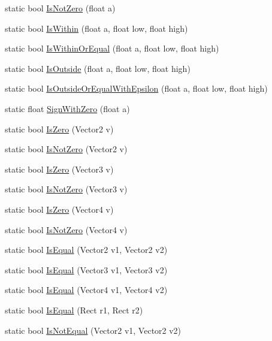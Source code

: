 \begin{DoxyCompactItemize}
\item 
static bool \hyperlink{class_math3_d_a165cde6214cb8dc360e62a1445823306}{Is\+Not\+Zero} (float a)
\item 
static bool \hyperlink{class_math3_d_a0fbec7ff9a0816ccee82b23e6d674981}{Is\+Within} (float a, float low, float high)
\item 
static bool \hyperlink{class_math3_d_a28c345936172776f2201aa51e8e040d3}{Is\+Within\+Or\+Equal} (float a, float low, float high)
\item 
static bool \hyperlink{class_math3_d_a616e6780c57dda6131c61c170e9847f1}{Is\+Outside} (float a, float low, float high)
\item 
static bool \hyperlink{class_math3_d_a451aa8ef4a6651ca172daeb097d3ddd1}{Is\+Outside\+Or\+Equal\+With\+Epsilon} (float a, float low, float high)
\item 
static float \hyperlink{class_math3_d_aacbf0bf5e0634621609a6bb6e0dda252}{Sign\+With\+Zero} (float a)
\item 
static bool \hyperlink{class_math3_d_ac0b99d9c74868285ae5969592d9498cb}{Is\+Zero} (Vector2 v)
\item 
static bool \hyperlink{class_math3_d_a9a008dd90716a6cf013777e15f2b573c}{Is\+Not\+Zero} (Vector2 v)
\item 
static bool \hyperlink{class_math3_d_acc93b045367c6388a1a0e9f4cca53e62}{Is\+Zero} (Vector3 v)
\item 
static bool \hyperlink{class_math3_d_ad643e55f4f3bdab7b306b7a1a6f9aba6}{Is\+Not\+Zero} (Vector3 v)
\item 
static bool \hyperlink{class_math3_d_a25967d19f327b29d00bc0604eedad2e3}{Is\+Zero} (Vector4 v)
\item 
static bool \hyperlink{class_math3_d_afb6b7c2ca8eadf5e8cef43b10f9589d0}{Is\+Not\+Zero} (Vector4 v)
\item 
static bool \hyperlink{class_math3_d_a83006309a82547a6fd89a440550dfd3b}{Is\+Equal} (Vector2 v1, Vector2 v2)
\item 
static bool \hyperlink{class_math3_d_a43c98a7e0eaa9e9e11c6f6bcf039b644}{Is\+Equal} (Vector3 v1, Vector3 v2)
\item 
static bool \hyperlink{class_math3_d_a4247fc5c67ac3f2d84d0f3cf98d9f9c3}{Is\+Equal} (Vector4 v1, Vector4 v2)
\item 
static bool \hyperlink{class_math3_d_a880b03349559f0ffb16c316e8b201e5b}{Is\+Equal} (Rect r1, Rect r2)
\item 
static bool \hyperlink{class_math3_d_adc17198f69b572695364825635f1cd30}{Is\+Not\+Equal} (Vector2 v1, Vector2 v2)

\end{DoxyCompactItemize}

